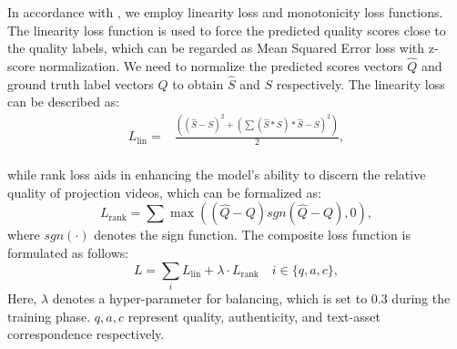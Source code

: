In accordance with \cite{wu2022fastquality, li2020norm}, we employ linearity loss and monotonicity loss functions. The linearity loss function is used to force the predicted quality scores close to the quality labels, which can be regarded as Mean Squared Error loss with z-score normalization. We need to normalize the predicted scores vectors $\hat{Q}$ and ground truth label vectors $Q$ to obtain $\hat{S}$ and $S$ respectively.
The linearity loss can be described as:
\begin{equation}
\begin{aligned}
    L_{\text{lin}} =& \frac{((\hat{S} - S)^{2} + (\sum (\hat{S} * S)*\hat{S} - S)^{2})}{2}, \\
\end{aligned}
\end{equation}

while rank loss aids in enhancing the model's ability to discern the relative quality of projection videos, which can be formalized as:
\begin{equation}
L_{\text{rank}} = \sum \max((\hat{Q} - Q)sgn(\hat{Q} - Q), 0),
\end{equation}
where $sgn(\cdot)$ denotes the sign function. The composite loss function is formulated as follows:
\begin{equation}
L = \sum_{i} L_{\text{lin}} + \lambda \cdot L_{\text{rank}} \quad i \in \{ q, a, c\}, 
\end{equation}
Here, $\lambda$ denotes a hyper-parameter for balancing, which is set to 0.3 during the training phase. $q, a, c$ represent quality, authenticity, and text-asset correspondence respectively. 


